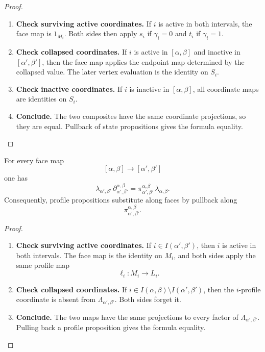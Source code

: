 \begin{proof}
    \leavevmode
    \begin{enumerate}
        \item \textbf{Check surviving active coordinates.}
        If \(i\) is active in both intervals, the face map is \(1_{M_i}\).
        Both sides then apply \(s_i\) if \(\gamma_i=0\) and \(t_i\) if
        \(\gamma_i=1\).

        \item \textbf{Check collapsed coordinates.}
        If \(i\) is active in \([\alpha,\beta]\) and inactive in
        \([\alpha',\beta']\), then the face map applies the endpoint map
        determined by the collapsed value. The later vertex evaluation is
        the identity on \(S_i\).

        \item \textbf{Check inactive coordinates.}
        If \(i\) is inactive in \([\alpha,\beta]\), all coordinate maps are
        identities on \(S_i\).

        \item \textbf{Conclude.}
        The two composites have the same coordinate projections, so they are
        equal. Pullback of state propositions gives the formula equality.
    \end{enumerate}
\end{proof}

\begin{proposition}
\label{prop:cmett-profile-substitution-law}
    For every face map
    \[
        [\alpha,\beta]\to[\alpha',\beta']
    \]
    one has
    \[
        \lambda_{\alpha',\beta'}
        \,
        \partial_{\alpha',\beta'}^{\alpha,\beta}
        =
        \pi_{\alpha',\beta'}^{\alpha,\beta}
        \,
        \lambda_{\alpha,\beta}.
    \]
    Consequently, profile propositions substitute along faces by pullback
    along
    \[
        \pi_{\alpha',\beta'}^{\alpha,\beta}.
    \]
\end{proposition}

\begin{proof}
    \leavevmode
    \begin{enumerate}
        \item \textbf{Check surviving active coordinates.}
        If \(i\in I(\alpha',\beta')\), then \(i\) is active in both
        intervals. The face map is the identity on \(M_i\), and both sides
        apply the same profile map
        \[
            \ell_i:M_i\to L_i.
        \]

        \item \textbf{Check collapsed coordinates.}
        If \(i\in I(\alpha,\beta)\setminus I(\alpha',\beta')\), then the
        \(i\)-profile coordinate is absent from
        \(\Lambda_{\alpha',\beta'}\). Both sides forget it.

        \item \textbf{Conclude.}
        The two maps have the same projections to every factor of
        \(\Lambda_{\alpha',\beta'}\). Pulling back a profile proposition
        gives the formula equality.
    \end{enumerate}
\end{proof}

